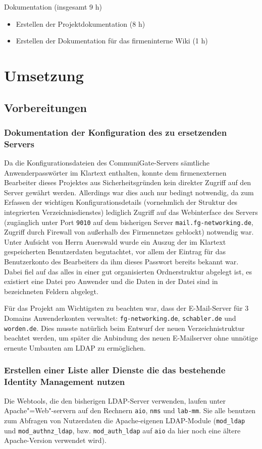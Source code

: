 \documentclass[11pt,a4paper,titlepage=firstiscover,headsepline,bibtotoc]{scrartcl} %
\begin{document}
Dokumentation (insgesamt 9 h)
	\begin{itemize}
	\item Erstellen der Projektdokumentation (8 h)
	\item Erstellen der Dokumentation für das firmeninterne Wiki (1 h)
	\end{itemize}

\section{Umsetzung}
\subsection{Vorbereitungen}
\subsubsection{Dokumentation der Konfiguration des zu ersetzenden Servers}\label{sec:Konfig-Doku-Alt}
Da die Konfigurationsdateien des CommuniGate-Servers sämtliche Anwenderpasswörter im Klartext enthalten, konnte dem firmenexternen Bearbeiter dieses Projektes aus Sicherheitsgründen kein direkter Zugriff auf den Server gewährt werden. Allerdings war dies auch nur bedingt notwendig, da zum Erfassen der wichtigen Konfigurationsdetails (vornehmlich der Struktur des integrierten Verzeichnisdienstes) lediglich Zugriff auf das Webinterface des Servers (zugänglich unter Port \texttt{9010} auf dem bisherigen Server \texttt{mail.fg-networking.de}, Zugriff durch Firewall von außerhalb des Firmennetzes geblockt) notwendig war. Unter Aufsicht von Herrn Auerswald wurde ein Auszug der im Klartext gespeicherten Benutzerdaten begutachtet, vor allem der Eintrag für das Benutzerkonto des Bearbeiters da ihm dieses Passwort bereits bekannt war. Dabei fiel auf das alles in einer gut organisierten Ordnerstruktur abgelegt ist, es existiert eine Datei pro Anwender und die Daten in der Datei sind in bezeichneten Feldern abgelegt.

Für das Projekt am Wichtigsten zu beachten war, dass der E-Mail-Server für 3 Domains Anwenderkonten verwaltet: \texttt{fg-networking.de}, \texttt{schabler.de} und \texttt{worden.de}. Dies musste natürlich beim Entwurf der neuen Verzeichnistruktur beachtet werden, um später die Anbindung des neuen E-Mailserver ohne unnötige erneute Umbauten am LDAP zu ermöglichen.

\subsubsection{Erstellen einer Liste aller Dienste die das bestehende Identity Management nutzen}
Die Webtools, die den bisherigen LDAP-Server verwenden, laufen unter Apache"=Web"-servern auf den Rechnern \texttt{aio}, \texttt{nms} und \texttt{lab-mm}. Sie alle benutzen zum Abfragen von Nutzerdaten die Apache-eigenen LDAP-Module (\texttt{mod\_ldap} und \texttt{mod\_authnz\_ldap}, bzw. \texttt{mod\_auth\_ldap} auf \texttt{aio} da hier noch eine ältere Apache-Version verwendet wird). 
\end{document}
